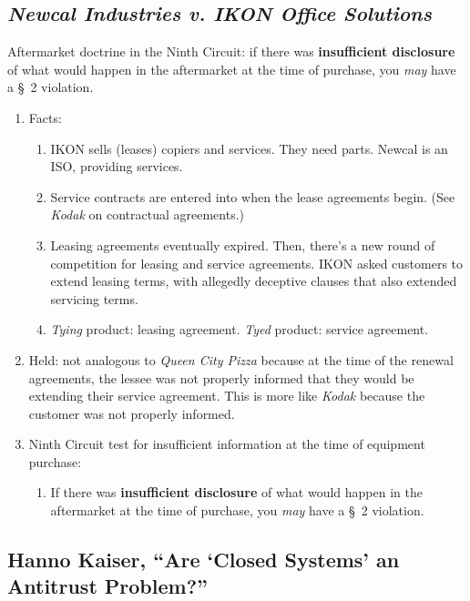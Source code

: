 \subsection{\emph{Newcal Industries v. IKON Office Solutions}}

Aftermarket doctrine in the Ninth Circuit: if there was \textbf{insufficient 
disclosure} of what would happen in the aftermarket at the time of purchase, 
you \emph{may} have a \S\ 2 violation.

\begin{enumerate}
    \item Facts:
    \begin{enumerate}
        \item IKON sells (leases) copiers and services. They need parts. 
        Newcal is an ISO, providing services.
        \item Service contracts are entered into when the lease agreements 
        begin. (See \emph{Kodak} on contractual agreements.)
        \item Leasing agreements eventually expired. Then, there's a new round 
        of competition for leasing and service agreements. IKON asked 
        customers to extend leasing terms, with allegedly deceptive clauses 
        that also extended servicing terms.
        \item \emph{Tying} product: leasing agreement. \emph{Tyed} product: 
        service agreement.
    \end{enumerate}
    \item Held: not analogous to \emph{Queen City Pizza} because at the time 
    of the renewal agreements, the lessee was not properly informed that they 
    would be extending their service agreement. This is more like \emph{Kodak} 
    because the customer was not properly informed.
    \item Ninth Circuit test for insufficient information at the time of 
    equipment purchase:
    \begin{enumerate}
        \item If there was \textbf{insufficient disclosure} of what would 
        happen in the aftermarket at the time of purchase, you \emph{may} have 
        a \S\ 2 violation.
    \end{enumerate}
\end{enumerate}

\subsection{Hanno Kaiser, ``Are `Closed Systems' an Antitrust Problem?''}
\label{sub:kaiser-closed-systems}

